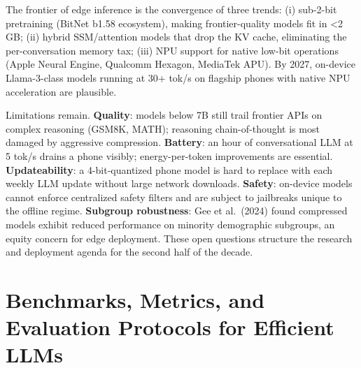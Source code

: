 The frontier of edge inference is the convergence of three trends: (i) sub-2-bit pretraining (BitNet b1.58 ecosystem), making frontier-quality models fit in \textless2 GB; (ii) hybrid SSM/attention models that drop the KV cache, eliminating the per-conversation memory tax; (iii) NPU support for native low-bit operations (Apple Neural Engine, Qualcomm Hexagon, MediaTek APU). By 2027, on-device Llama-3-class models running at 30+ tok/s on flagship phones with native NPU acceleration are plausible.

Limitations remain. \textbf{Quality}: models below 7B still trail frontier APIs on complex reasoning (GSM8K, MATH); reasoning chain-of-thought is most damaged by aggressive compression. \textbf{Battery}: an hour of conversational LLM at 5 tok/s drains a phone visibly; energy-per-token improvements are essential. \textbf{Updateability}: a 4-bit-quantized phone model is hard to replace with each weekly LLM update without large network downloads. \textbf{Safety}: on-device models cannot enforce centralized safety filters and are subject to jailbreaks unique to the offline regime. \textbf{Subgroup robustness}: Gee et al.~(2024) found compressed models exhibit reduced performance on minority demographic subgroups, an equity concern for edge deployment. These open questions structure the research and deployment agenda for the second half of the decade.

\section{Benchmarks, Metrics, and Evaluation Protocols for Efficient LLMs}\label{benchmarks-metrics-and-evaluation-protocols-for-efficient-llms}

